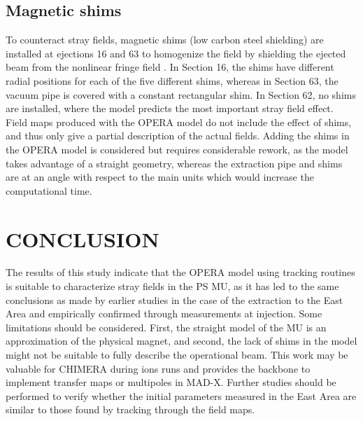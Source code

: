 \documentclass[a4paper,
               biblatex,     %
               keeplastbox,   %
               ]{jacow}
\begin{document}
\subsection{Magnetic shims}

To counteract stray fields, magnetic shims (low carbon steel shielding) are installed at ejections 16 and 63 to homogenize the field by shielding the ejected beam from the nonlinear fringe field \cite{zickler_influence_nodate}. In Section 16, the shims have different radial positions for each of the five different shims, whereas in Section 63, the vacuum pipe is covered with a constant rectangular shim. In Section 62, no shims are installed, where the model predicts the most important stray field effect. Field maps produced with the OPERA model do not include the effect of shims, and thus only give a partial description of the actual fields. Adding the shims in the OPERA model is considered but requires considerable rework, as the model takes advantage of a straight geometry, whereas the extraction pipe and shims are at an angle with respect to the main units which would increase the computational time.


\section{CONCLUSION}
The results of this study indicate that the OPERA model using tracking routines is suitable to characterize stray fields in the PS MU, as it has led to the same conclusions as made by earlier studies in the case of the extraction to the East Area and empirically confirmed through measurements at injection. Some limitations should be considered. First, the straight model of the MU is an approximation of the physical magnet, and second, the lack of shims in the model might not be suitable to fully describe the operational beam. This work may be valuable for CHIMERA during ions runs and provides the backbone to implement transfer maps or multipoles in MAD-X. Further studies should be performed to verify whether the initial parameters measured in the East Area are similar to those found by tracking through the field maps.

\printbibliography
\end{document}
